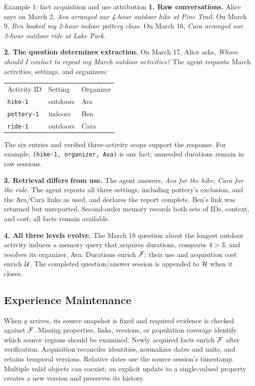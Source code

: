 \begin{memoryexample}{Example 1: fact acquisition and use attribution}
\textbf{1. Raw conversations.} Alice says on March 2,
\emph{Ava arranged our 4-hour outdoor hike at Pine Trail.}
On March 9, \emph{Ben booked my 2-hour indoor pottery class.}
On March 16, \emph{Cara arranged our 3-hour outdoor ride at Lake Park.}

\smallskip
\textbf{2. The question determines extraction.} On March 17, Alice asks,
\emph{Whom should I contact to repeat my March outdoor activities?}
The agent requests March activities, settings, and organizers:

\begin{center}
\begin{tabular}{@{}lll@{}}
Activity ID & Setting & Organizer\\
\texttt{hike-1} & outdoors & Ava\\
\texttt{pottery-1} & indoors & Ben\\
\texttt{ride-1} & outdoors & Cara\\
\end{tabular}
\end{center}
The six entries and verified three-activity scope support the response.
For example, \texttt{(hike-1, organizer, Ava)} is one fact;
unneeded durations remain in raw sessions.

\smallskip
\textbf{3. Retrieval differs from use.} The agent answers,
\emph{Ava for the hike; Cara for the ride.}
The agent reports all three settings, including pottery's exclusion,
and the Ava/Cara links as used, and declares the report complete.
Ben's link was returned but unreported. Second-order memory records
both sets of IDs, context, and cost; all facts remain available.

\smallskip
\textbf{4. All three levels evolve.} The March 18 question about the
longest outdoor activity induces a memory query that acquires durations,
compares $4>3$, and resolves its organizer, Ava.
Durations enrich $\mathcal{F}$; their use and acquisition cost enrich $\mathcal{U}$.
The completed question/answer session is appended to $\mathcal{H}$ when it closes.
\end{memoryexample}

\subsection{Experience Maintenance}
\label{subsec:new-evolution}

When $q$ arrives, its source snapshot is fixed and required evidence is
checked against $\mathcal{F}$.
Missing properties, links, versions, or population coverage identify
which source regions should be examined. Newly acquired facts enrich
$\mathcal{F}$ after verification. Acquisition reconciles identities, normalizes
dates and units, and retains temporal versions. Relative dates use the source
session's timestamp. Multiple valid objects can coexist; an explicit
update to a single-valued property creates a new version and preserves
its history.

